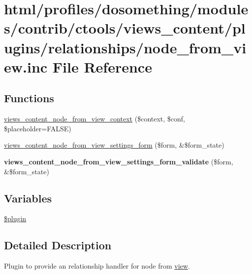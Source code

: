 \hypertarget{node__from__view_8inc}{
\section{html/profiles/dosomething/modules/contrib/ctools/views\_\-content/plugins/relationships/node\_\-from\_\-view.inc File Reference}
\label{node__from__view_8inc}
}
\subsection*{Functions}
\begin{DoxyCompactItemize}
\item 
\hyperlink{node__from__view_8inc_aec0e25eb34d28184ac8028e9132e882c}{views\_\-content\_\-node\_\-from\_\-view\_\-context} (\$context, \$conf, \$placeholder=FALSE)
\item 
\hyperlink{node__from__view_8inc_a6223e4e367fd97ccd351ea1811aa9649}{views\_\-content\_\-node\_\-from\_\-view\_\-settings\_\-form} (\$form, \&\$form\_\-state)
\item 
\hypertarget{node__from__view_8inc_ade3875c32421715a2e794a2605238175}{
{\bfseries views\_\-content\_\-node\_\-from\_\-view\_\-settings\_\-form\_\-validate} (\$form, \&\$form\_\-state)}
\label{node__from__view_8inc_ade3875c32421715a2e794a2605238175}

\end{DoxyCompactItemize}
\subsection*{Variables}
\begin{DoxyCompactItemize}
\item 
\hyperlink{node__from__view_8inc_ada8a7130088351710bb02ed622d6bf65}{\$plugin}
\end{DoxyCompactItemize}


\subsection{Detailed Description}
Plugin to provide an relationship handler for node from \hyperlink{classview}{view}. 

